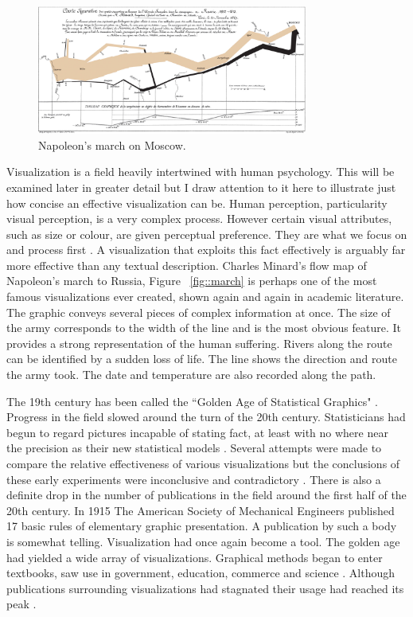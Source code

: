 \documentclass[a4paper, 10pt, titlepage, twocolumn]{article}
\begin{document}
\begin{figure}[hbt]
  \begin{center}
    \includegraphics[width=3.5in]{Minard.png}
  \end{center}
  \caption{\small Napoleon's march on Moscow.}
  \label{fig:march}
\end{figure}



Visualization is a field heavily intertwined with human psychology. This will be examined later in greater detail but I draw attention to it here to illustrate just how concise an effective visualization can be. Human perception, particularity visual perception, is a very complex process. However certain visual attributes, such as size or colour, are given perceptual preference. They are what we focus on and process first \cite{mackinlay1986automating}. A visualization that exploits this fact effectively is arguably far more effective than any textual description. Charles Minard's flow map of Napoleon's march to Russia, Figure ~\ref{fig::march} is perhaps one of the most famous visualizations ever created, shown again and again in academic literature. The graphic conveys several pieces of complex information at once. The size of the army corresponds to the width of the line and is the most obvious feature. It provides a strong representation of the human suffering. Rivers along the route can be identified by a sudden loss of life. The line shows the direction and route the army took. The date and temperature are also recorded along the path.

The 19th century has been called the ``Golden Age of Statistical Graphics" \cite{friendly2008golden}. Progress in the field slowed around the turn of the 20th century. Statisticians had begun to regard pictures incapable of stating fact, at least with no where near the precision as their new statistical models \cite{friendly2000discussion}. Several attempts were made to compare the relative effectiveness of various visualizations but the conclusions of these early experiments were inconclusive and contradictory \cite{fienberg1979graphical}. There is also a definite drop in the number of publications in the field around the first half of the 20th century. In 1915 The American Society of Mechanical Engineers published 17 basic rules of elementary graphic presentation. A publication by such a body is somewhat telling. Visualization had once again become a tool. The golden age had yielded a wide array of visualizations. Graphical methods began to enter textbooks, saw use in government, education, commerce and science \cite{haskell1919make,ayres1919war,gantt1919organization}. Although publications surrounding visualizations had stagnated their usage had reached its peak \cite{fienberg1979graphical}.
\end{document}
